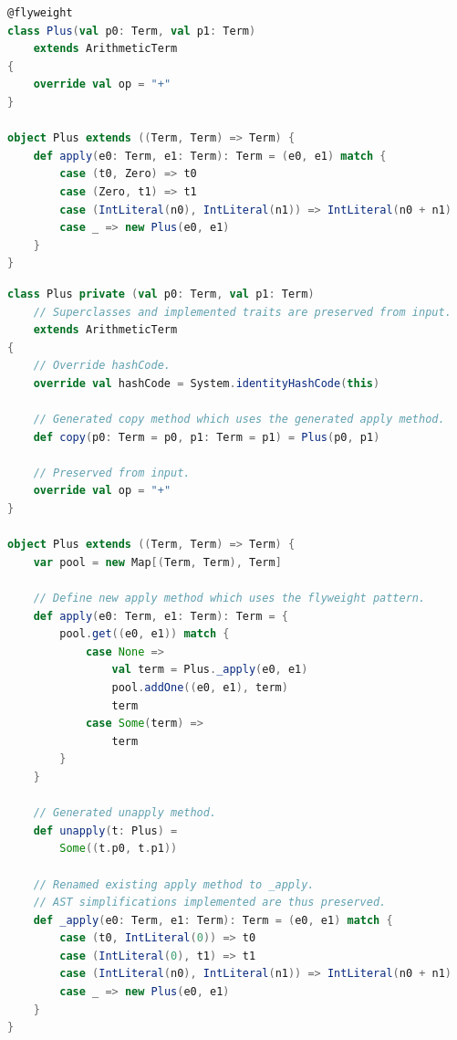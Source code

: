 \documentclass[11pt]{article}
\begin{document}
    \begin{lstlisting}[language=Scala, caption={Input code annotated with the macro.}, label={lst:macro-input}]
@flyweight
class Plus(val p0: Term, val p1: Term)
    extends ArithmeticTerm
{
    override val op = "+"
}

object Plus extends ((Term, Term) => Term) {
    def apply(e0: Term, e1: Term): Term = (e0, e1) match {
        case (t0, Zero) => t0
        case (Zero, t1) => t1
        case (IntLiteral(n0), IntLiteral(n1)) => IntLiteral(n0 + n1)
        case _ => new Plus(e0, e1)
    }
}        
    \end{lstlisting}

    \begin{lstlisting}[language=Scala, caption={Output code generated by our macro.}, label={lst:macro-output}]
class Plus private (val p0: Term, val p1: Term)
    // Superclasses and implemented traits are preserved from input.
    extends ArithmeticTerm
{
    // Override hashCode.
    override val hashCode = System.identityHashCode(this)

    // Generated copy method which uses the generated apply method.
    def copy(p0: Term = p0, p1: Term = p1) = Plus(p0, p1)

    // Preserved from input.
    override val op = "+"
}

object Plus extends ((Term, Term) => Term) {
    var pool = new Map[(Term, Term), Term]

    // Define new apply method which uses the flyweight pattern.
    def apply(e0: Term, e1: Term): Term = {
        pool.get((e0, e1)) match {
            case None => 
                val term = Plus._apply(e0, e1)
                pool.addOne((e0, e1), term)
                term
            case Some(term) => 
                term
        }
    }

    // Generated unapply method.
    def unapply(t: Plus) =
        Some((t.p0, t.p1))

    // Renamed existing apply method to _apply.
    // AST simplifications implemented are thus preserved.
    def _apply(e0: Term, e1: Term): Term = (e0, e1) match {
        case (t0, IntLiteral(0)) => t0
        case (IntLiteral(0), t1) => t1
        case (IntLiteral(n0), IntLiteral(n1)) => IntLiteral(n0 + n1)
        case _ => new Plus(e0, e1)
    }
}       
    \end{lstlisting}

\end{document}
